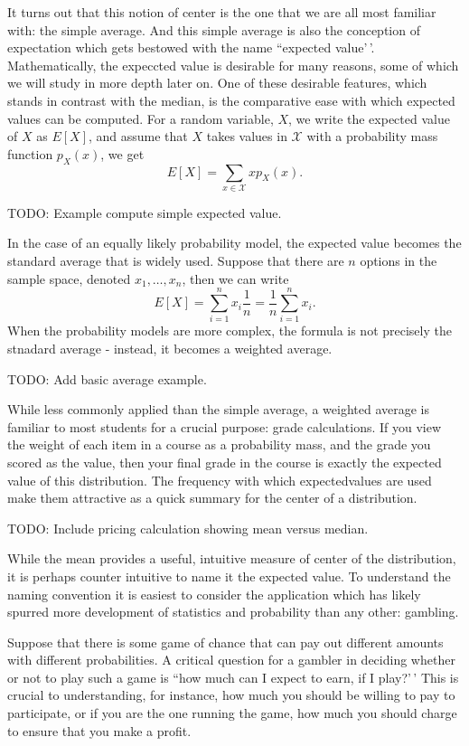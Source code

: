 \documentclass[
  letterpaper,
  DIV=11,
  numbers=noendperiod]{scrreprt}
\begin{document}
It turns out that this notion of center is the one that we are all most
familiar with: the simple average. And this simple average is also the
conception of expectation which gets bestowed with the name ``expected
value'\,'. Mathematically, the expeccted value is desirable for many
reasons, some of which we will study in more depth later on. One of
these desirable features, which stands in contrast with the median, is
the comparative ease with which expected values can be computed. For a
random variable, \(X\), we write the expected value of \(X\) as
\(E[X]\), and assume that \(X\) takes values in \(\mathcal{X}\) with a
probability mass function \(p_X(x)\), we get
\[E[X] = \sum_{x \in \mathcal{X}} xp_X(x).\]

TODO: Example compute simple expected value.

In the case of an equally likely probability model, the expected value
becomes the standard average that is widely used. Suppose that there are
\(n\) options in the sample space, denoted \(x_1,\dots,x_n\), then we
can write
\[E[X] = \sum_{i=1}^n x_i\frac{1}{n} = \frac{1}{n}\sum_{i=1}^nx_i.\]
When the probability models are more complex, the formula is not
precisely the stnadard average - instead, it becomes a weighted average.

TODO: Add basic average example.

While less commonly applied than the simple average, a weighted average
is familiar to most students for a crucial purpose: grade calculations.
If you view the weight of each item in a course as a probability mass,
and the grade you scored as the value, then your final grade in the
course is exactly the expected value of this distribution. The frequency
with which expectedvalues are used make them attractive as a quick
summary for the center of a distribution.

TODO: Include pricing calculation showing mean versus median.

While the mean provides a useful, intuitive measure of center of the
distribution, it is perhaps counter intuitive to name it the expected
value. To understand the naming convention it is easiest to consider the
application which has likely spurred more development of statistics and
probability than any other: gambling.

Suppose that there is some game of chance that can pay out different
amounts with different probabilities. A critical question for a gambler
in deciding whether or not to play such a game is ``how much can I
expect to earn, if I play?'\,' This is crucial to understanding, for
instance, how much you should be willing to pay to participate, or if
you are the one running the game, how much you should charge to ensure
that you make a profit.
\end{document}
